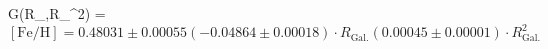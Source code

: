 G(R_,R_^2) = $\mathrm{[Fe/H]} = 0.48031 \pm 0.00055 (-0.04864 \pm 0.00018) \cdot R_\mathrm{Gal.} (0.00045 \pm 0.00001) \cdot R_\mathrm{Gal.}^2$%
